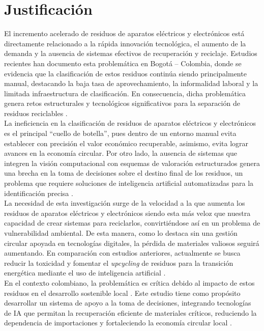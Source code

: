 \chapter{Justificación}

El incremento acelerado de residuos de aparatos eléctricos y electrónicos está directamente relacionado a la rápida innovación tecnológica, el aumento de la demanda y la ausencia de sistemas efectivos de recuperación y reciclaje. Estudios recientes han documento esta problemática en Bogotá – Colombia, donde se evidencia que la clasificación de estos residuos continúa siendo principalmente manual, destacando la baja tasa de aprovechamiento, la informalidad laboral y la limitada infraestructura de clasificación. En consecuencia, dicha problemática genera retos estructurales y tecnológicos significativos para la separación de residuos reciclables \cite{a.ceronRecyclableWasteClassification2025a}.\\

La ineficiencia en la clasificación de residuos de aparatos eléctricos y electrónicos es el principal “cuello de botella”, pues dentro de un entorno manual evita establecer con precisión el valor económico recuperable, asimismo, evita lograr avances en la economía circular. Por otro lado, la ausencia de sistemas que integren la visión computacional con esquemas de valoración estructurados genera una brecha en la toma de decisiones sobre el destino final de los residuos, un problema que requiere soluciones de inteligencia artificial automatizadas para la identificación precisa \cite{jesiddiazbastosImpactoResiduosAparatos2025}.\\

La necesidad de esta investigación surge de la velocidad a la que aumenta los residuos de aparatos eléctricos y electrónicos siendo esta más veloz que nuestra capacidad de crear sistemas para reciclarlos, convirtiéndose así en un problema de vulnerabilidad ambiental. De esta manera, como lo destaca \cite{janoClosingLoopSystematic2026} sin una gestión circular apoyada en tecnologías digitales, la pérdida de materiales valiosos seguirá aumentando. En comparación con estudios anteriores, actualmente se busca reducir la toxicidad y fomentar el \textit{upcycling} de residuos para la transición energética mediante el uso de inteligencia artificial \cite{dagwar_upcycling_2026}.\\

En el contexto colombiano, la problemática es crítica debido al impacto de estos residuos en el desarrollo sostenible local \cite{jesiddiazbastosImpactoResiduosAparatos2025}. Este estudio tiene como propósito desarrollar un sistema de apoyo a la toma de decisiones, integrando tecnologías de IA que permitan la recuperación eficiente de materiales críticos, reduciendo la dependencia de importaciones y fortaleciendo la economía circular local \cite{souzaCHALLENGESTRANSITIONCIRCULAR2025}.\\

